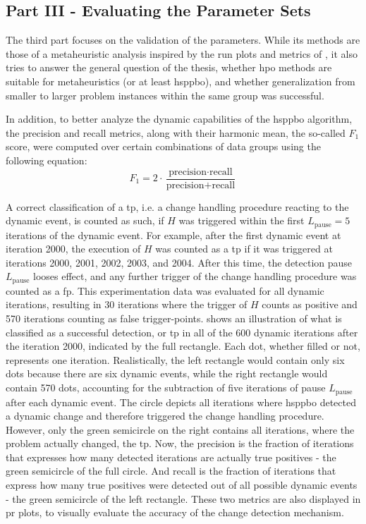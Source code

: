 \subsection{Part III - Evaluating the Parameter Sets}
\label{chap:an-part3}

The third part focuses on the validation of the parameters. While its methods are those of a metaheuristic analysis inspired by the run plots and metrics of \cite{kupfer2021hierarchical}, it also tries to answer the  general question of the thesis, whether \gls{hpo} methods are suitable for metaheuristics (or at least \gls{hsppbo}), and whether generalization from smaller to larger problem instances within the same group was successful. 

In addition, to better analyze the dynamic capabilities of the \gls{hsppbo} algorithm, the precision and recall metrics, along with their harmonic mean, the so-called $F_1$ score, were computed over certain combinations of data groups using the following equation:
\begin{equation}
	F_1 = 2\cdot \frac{\text{precision} \cdot \text{recall}}{\text{precision} + \text{recall}}
\end{equation}

A correct classification of a \gls{tp}, i.e. a change handling procedure reacting to the dynamic event, is counted as such, if $H$ was triggered within the first $L_\text{pause} = 5$ iterations of the dynamic event. For example, after the first dynamic event at iteration 2000, the execution of $H$ was counted as a \gls{tp} if it was triggered at iterations 2000, 2001, 2002, 2003, and 2004. After this time, the detection pause $L_\text{pause}$ looses effect, and any further trigger of the change handling procedure was counted as a \gls{fp}. This experimentation data was evaluated for all dynamic iterations, resulting in 30 iterations where the trigger of $H$ counts as positive and 570 iterations counting as false trigger-points.
 shows an illustration of what is classified as a successful detection, or \gls{tp} in all of the 600 dynamic iterations after the iteration 2000, indicated by the full rectangle. Each dot, whether filled or not, represents one iteration. Realistically, the left rectangle would contain only six dots because there are six dynamic events, while the right rectangle would contain 570 dots, accounting for the subtraction of five iterations of pause $L_\text{pause}$ after each dynamic event. The circle depicts all iterations where \gls{hsppbo} detected a dynamic change and therefore triggered the change handling procedure. However, only the green semicircle on the right contains all iterations, where the problem actually changed, the \gls{tp}.
Now, the precision is the fraction of iterations that expresses how many detected iterations are actually true positives - the green semicircle of the full circle. And recall is the fraction of iterations that express how many true positives were detected out of all possible dynamic events - the green semicircle of the left rectangle. These two metrics are also displayed in \gls{pr} plots, to visually evaluate the accuracy of the change detection mechanism. 

